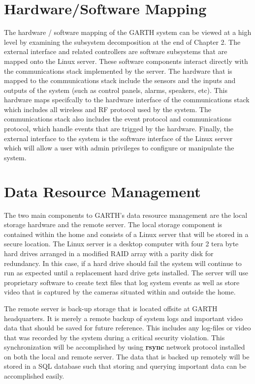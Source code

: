 \documentclass{report}
\begin{document}
\section{Hardware/Software Mapping}

The hardware / software mapping of the GARTH system can be viewed at a high
level by examining the subsystem decomposition at the end of Chapter 2. The
external interface and related controllers are software subsystems that are
mapped onto the Linux server. These software components interact directly with
the communications stack implemented by the server. The hardware that is mapped
to the communications stack include the sensors and the inputs and outputs of 
the system (such as control panels, alarms, speakers, etc). This hardware maps 
specifcally to the hardware interface of the communications stack which includes
all wireless and RF protocol used by the system. The communications stack also
includes the event protocol and communications protocol, which handle events
that are trigged by the hardware. Finally, the external interface to the system
is the software interface of the Linux server which will allow a user with admin
privileges to configure or manipulate the system.

\section{Data Resource Management}

The two main components to GARTH's data resource management are the local
storage hardware and the remote server. The local storage component is
contained within the home and consists of a Linux server that will be stored in
a secure location. The Linux server is a desktop computer with four 2 tera byte
hard drives arranged in a modified RAID array with a parity disk for
redundancy. In this case, if a hard drive should fail the system will continue
to run as expected until a replacement hard drive gets installed. The server
will use proprietary software  to create text files that log system events as
well as store video that is captured by the cameras situated within and outside
the home.

The remote server is back-up storage that is located offsite at GARTH
headquarters. It is merely a remote backup of system logs and important video
data that should be saved for future reference. This includes any log-files or
video that was recorded by the system during a critical security violation. This
synchronization will be accomplished by using \textbf{rsync} network protocol
installed on both the local and remote server. The data that is backed up
remotely will be stored in a SQL database such that storing and querying
important data can be accomplished easily.
\end{document}
